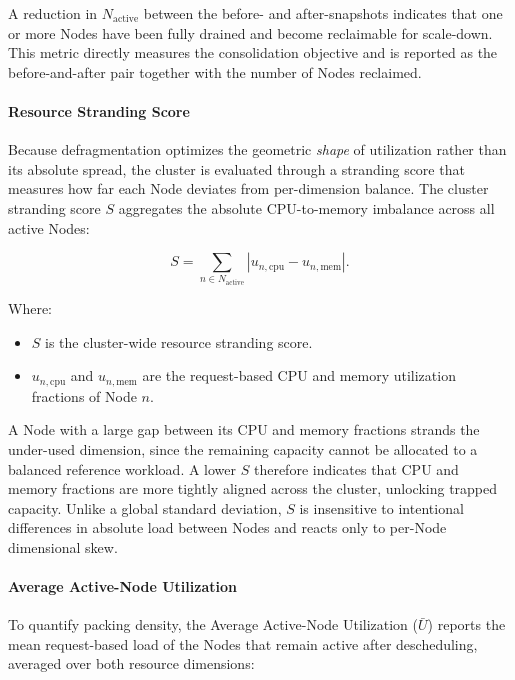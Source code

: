 A reduction in \(N_{\text{active}}\) between the before- and after-snapshots indicates that one or more Nodes have been fully drained and become reclaimable for scale-down. This metric directly measures the consolidation objective and is reported as the before-and-after pair together with the number of Nodes reclaimed.

\paragraph{Resource Stranding Score}
\label{subsubsec:defrag_metric_stranding}
Because defragmentation optimizes the geometric \emph{shape} of utilization rather than its absolute spread, the cluster is evaluated through a stranding score that measures how far each Node deviates from per-dimension balance. The cluster stranding score \(S\) aggregates the absolute CPU-to-memory imbalance across all active Nodes:

\[
    S = \sum_{n \in N_{\text{active}}} \left|u_{n,\text{cpu}} - u_{n,\text{mem}}\right|.
\]

Where:

\begin{itemize}
    \item \(S\) is the cluster-wide resource stranding score.

    \item \(u_{n,\text{cpu}}\) and \(u_{n,\text{mem}}\) are the request-based CPU and memory utilization fractions of Node \(n\).
\end{itemize}

A Node with a large gap between its CPU and memory fractions strands the under-used dimension, since the remaining capacity cannot be allocated to a balanced reference workload. A lower \(S\) therefore indicates that CPU and memory fractions are more tightly aligned across the cluster, unlocking trapped capacity. Unlike a global standard deviation, \(S\) is insensitive to intentional differences in absolute load between Nodes and reacts only to per-Node dimensional skew.

\paragraph{Average Active-Node Utilization}
\label{subsubsec:defrag_metric_density}
To quantify packing density, the Average Active-Node Utilization (\(\bar{U}\)) reports the mean request-based load of the Nodes that remain active after descheduling, averaged over both resource dimensions:

